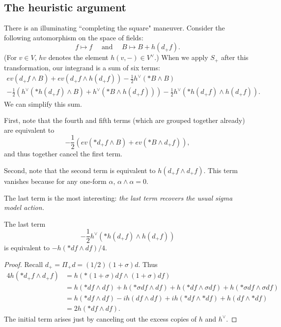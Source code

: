\subsection{The heuristic argument} 

There is an illuminating ``completing the square" maneuver. Consider the following automorphism on the space of fields:
\[
f \mapsto f \quad \text{ and } \quad B \mapsto B + h (d_+ f).
\]  
(For $v \in V$, $hv$ denotes the element $h(v, -) \in V^\vee$.) When we apply $S_+$ after this transformation, our integrand is a sum of six terms:
\begin{multline*}
 ev(d_+ f \wedge B) + ev(d_+ f \wedge h (d_+ f))  - \frac{1}{2}  h^\vee(\ast B \wedge B) \\  - \frac{1}{2} \left(  h^\vee(\ast h(d_+ f) \wedge B) +  h^\vee(\ast B \wedge h(d_+f))\right)    - \frac{1}{2} h^\vee(\ast h(d_+f) \wedge h(d_+f)).
\end{multline*}
We can simplify this sum.

First, note that the fourth and fifth terms (which are grouped together already) are equivalent to
\[
- \frac{1}{2} \left( ev(\ast d_+ f \wedge B) +  ev(\ast B \wedge d_+f)\right) ,
\]
and thus together cancel the first term.

Second, note that the second term is equivalent to $h(d_+ f \wedge d_+ f)$. This term vanishes because for any one-form $\alpha$, $\alpha \wedge \alpha = 0$.

The last term is the most interesting: {\it the last term recovers the usual sigma model action.}

\begin{lemma}\label{SOvsPlus}
The last term
\[
- \frac{1}{2} h^\vee(\ast h(d_+f) \wedge h(d_+f))
\] 
is equivalent to $-h(\ast df \wedge df)/4$.
\end{lemma}

\begin{proof}
Recall $d_+ = \Pi_+ d = (1/2) (1 + \sigma) d$. Thus
\begin{align*}
4h(\ast d_+ f \wedge d_+f) &= h(\ast (1+\sigma)d f \wedge (1+\sigma)df)\\
&= h(\ast df \wedge df) + h(\ast \sigma df \wedge df) + h(\ast df \wedge \sigma df) + h(\ast \sigma df \wedge \sigma df) \\
&= h(\ast df \wedge df) -i h( df \wedge df) + ih(\ast df \wedge \ast df) + h( df \wedge \ast df) \\
&= 2 h(\ast df \wedge df).
\end{align*}
The initial term arises just by canceling out the excess copies of $h$ and $h^\vee$.
\end{proof}

